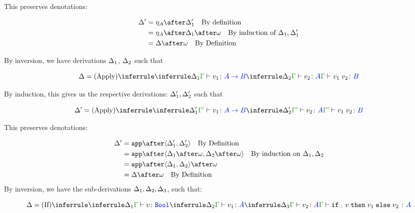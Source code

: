 \documentclass{report}
\begin{document}
This preserves denotations:

\begin{align*}
    \D' & = \point{A}\after\D_1' \qt{By definition}\\
        & = \point{A}\after\D_1\after\w\qt{By induction of $\D_1, \D_1'$}\\
        & = \D\after\w\qt{By Definition}
\end{align*}

    By inversion, we have derivations $\Delta_1$, $\Delta_2$ such that

    \begin{equation}
        \D = 
        \ntreeruleII{Apply}{
            \treeruleI{\D_1}{\gtyperelation{v_1}{\ab}}
            }{
            \treeruleI{\D_2}{\gtyperelation{v_2}{A}}
        } {
            \gtyperelation{\apply{v_1}{v_2}}{B}
        }
    \end{equation}

    By induction, this gives us the respective derivations: $\Delta_1',\Delta_2'$ such that

    
    \begin{equation}
        \D' = 
        \ntreeruleII{Apply}{
            \treeruleI{\D_1'}{\typerelation{\G'}{v_1}{\ab}}
            }{
            \treeruleI{\D_2'}{\typerelation{\G'}{v_2}{A}}
        } {
            \typerelation{\G'}{\apply{v_1}{v_2}}{B}
        }
    \end{equation}

    This preserves denotations:

    \begin{align*}
        \D' &= \app\after\pr{\D_1'}{\D_2'} \qt{By Definition}\\
        &= \app\after\pr{\D_1\after\w}{\D_2\after\w} \qt{By induction on $\D_1, \D_2$}\\
        &= \app\after\pr{\D_1}{\D_2}\after\w\\
        &= \D\after\w\qt{By Definition}
    \end{align*}
By inversion, we have the sub-derivations $\Delta_1,\Delta_2,\Delta_3$, such that:


\begin{equation}
    \D = \ntreeruleIII{If}{
        \treeruleI{\D_1}{\typerelation{\G}{v}{\B}}
        }{
        \treeruleI{\D_2}{\typerelation{\G}{v_1}{ A}}
        }{
        \treeruleI{\D_3}{\typerelation{\G}{v_2}{ A}}
    }{
        \typerelation{\G}{\pifthenelse{A}{v}{v_1}{v_2}}{ A}
    }
\end{equation}
\end{document}
